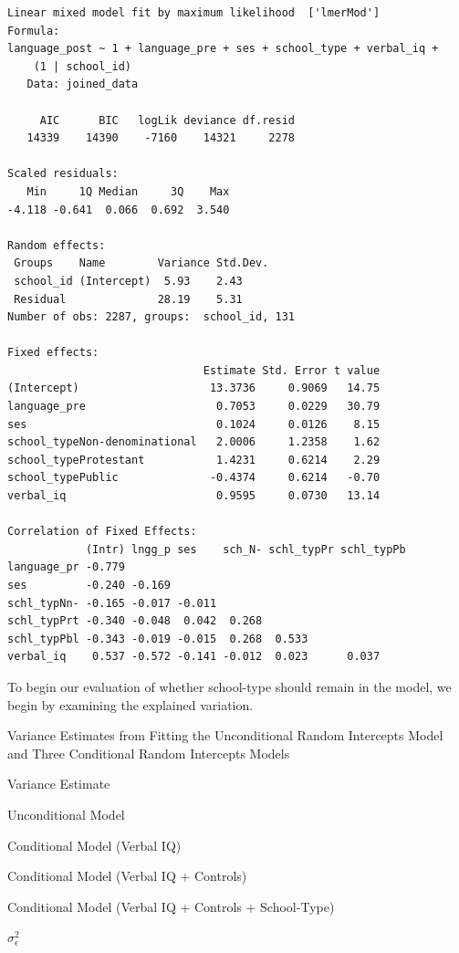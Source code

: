 \documentclass[]{book}
\begin{document}
\begin{verbatim}
Linear mixed model fit by maximum likelihood  ['lmerMod']
Formula: 
language_post ~ 1 + language_pre + ses + school_type + verbal_iq +  
    (1 | school_id)
   Data: joined_data

     AIC      BIC   logLik deviance df.resid 
   14339    14390    -7160    14321     2278 

Scaled residuals: 
   Min     1Q Median     3Q    Max 
-4.118 -0.641  0.066  0.692  3.540 

Random effects:
 Groups    Name        Variance Std.Dev.
 school_id (Intercept)  5.93    2.43    
 Residual              28.19    5.31    
Number of obs: 2287, groups:  school_id, 131

Fixed effects:
                              Estimate Std. Error t value
(Intercept)                    13.3736     0.9069   14.75
language_pre                    0.7053     0.0229   30.79
ses                             0.1024     0.0126    8.15
school_typeNon-denominational   2.0006     1.2358    1.62
school_typeProtestant           1.4231     0.6214    2.29
school_typePublic              -0.4374     0.6214   -0.70
verbal_iq                       0.9595     0.0730   13.14

Correlation of Fixed Effects:
            (Intr) lngg_p ses    sch_N- schl_typPr schl_typPb
language_pr -0.779                                           
ses         -0.240 -0.169                                    
schl_typNn- -0.165 -0.017 -0.011                             
schl_typPrt -0.340 -0.048  0.042  0.268                      
schl_typPbl -0.343 -0.019 -0.015  0.268  0.533               
verbal_iq    0.537 -0.572 -0.141 -0.012  0.023      0.037    
\end{verbatim}

To begin our evaluation of whether school-type should remain in the model, we begin by examining the explained variation.

\label{tab:unnamed-chunk-222}Variance Estimates from Fitting the Unconditional Random Intercepts Model and Three Conditional Random Intercepts Models

Variance Estimate

Unconditional Model

Conditional Model
(Verbal IQ)

Conditional Model
(Verbal IQ + Controls)

Conditional Model
(Verbal IQ + Controls + School-Type)

\(\sigma^2_{\epsilon}\)
\end{document}
